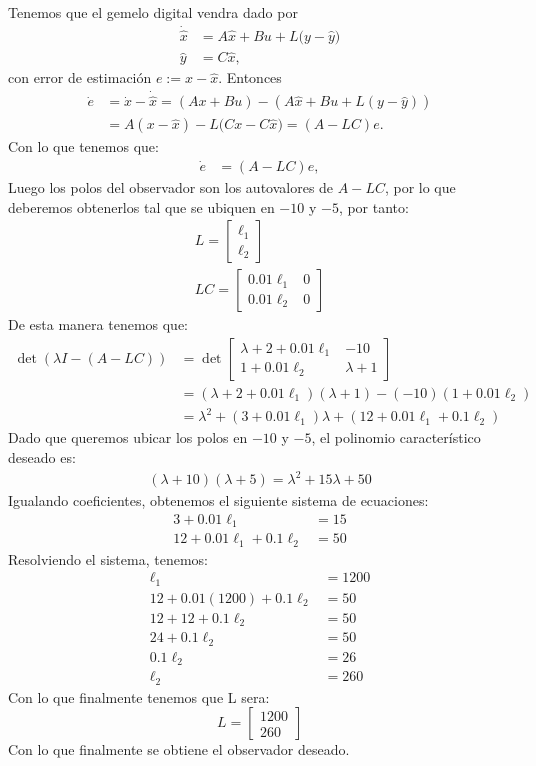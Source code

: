 \documentclass[
  11pt,
  letterpaper,
   addpoints,
   answers
  ]{exam}
\begin{document}
\begin{solution}
Tenemos que el gemelo digital vendra dado por
\begin{align}
\dot{\hat x} &= A\hat x + Bu + L\big(y-\hat y\big)\\
\hat y &= C\hat x,
\end{align}
con error de estimación $e:=x-\hat x$. Entonces
\begin{align}
\dot e
&= \dot x - \dot{\hat x}
= (Ax+Bu) - (A\hat x + Bu + L(y-\hat y)) \\
&= A(x-\hat x) - L\big(Cx - C\hat x\big)
= (A-LC)e. \label{eq:error_dyn}
\end{align}
Con lo que tenemos que:
\begin{align}
\dot e &= (A-LC)e,
\end{align}
Luego los polos del observador son los autovalores de $A-LC$, por lo que deberemos obtenerlos tal que se ubiquen en $-10$ y $-5$, por tanto:
\begin{align}
  L= \begin{bmatrix} \ell_1 \\ \ell_2 \end{bmatrix}\\
  LC = \begin{bmatrix} 0.01\ell_1 & 0 \\ 0.01\ell_2 & 0 \end{bmatrix}
\end{align}
De esta manera tenemos que:
\begin{align}
  \det(\lambda I - (A-LC)) &= \det\begin{bmatrix} \lambda + 2 + 0.01\ell_1 & -10 \\ 1 + 0.01\ell_2 & \lambda + 1 \end{bmatrix} \\
  &= (\lambda + 2 + 0.01\ell_1)(\lambda + 1) - (-10)(1 + 0.01\ell_2) \\
  &= \lambda^2 + (3 + 0.01\ell_1)\lambda + (12 + 0.01\ell_1 + 0.1\ell_2)
\end{align}
Dado que queremos ubicar los polos en $-10$ y $-5$, el polinomio característico deseado es:
\begin{align}
  (\lambda + 10)(\lambda + 5) = \lambda^2 + 15\lambda + 50
\end{align}
Igualando coeficientes, obtenemos el siguiente sistema de ecuaciones:
\begin{align}
  3 + 0.01\ell_1 &= 15 \\
  12 + 0.01\ell_1 + 0.1\ell_2 &= 50
\end{align}
Resolviendo el sistema, tenemos:
\begin{align}
  \ell_1 &= 1200 \\
  12 + 0.01(1200) + 0.1\ell_2 &= 50 \\
  12 + 12 + 0.1\ell_2 &= 50 \\
  24 + 0.1\ell_2 &= 50 \\
  0.1\ell_2 &= 26 \\
  \ell_2 &= 260
\end{align}
Con lo que finalmente tenemos que L sera:
\[
L=\begin{bmatrix}1200\\260\end{bmatrix}
\]
Con lo que finalmente se obtiene el observador deseado.
\end{solution}
\end{document}
